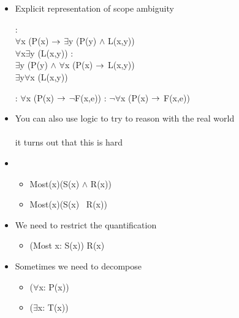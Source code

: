 \documentclass[a4paper,landscape,headrule,footrule,xetex]{foils}
\begin{document}

\begin{itemize}
\item Explicit representation of scope ambiguity
  \begin{exe}
    \ex {}
    \begin{xlist}
          \ex {}:  
          \\ $\forall$x (P(x) $\rightarrow$ $\exists$y (P(y) $\wedge$ L(x,y))
          \\ $\forall$x$\exists$y (L(x,y))
          \ex {}: 
          \\   $\exists$y (P(y) $\wedge$ $\forall$x (P(x) $\rightarrow$ L(x,y))
          \\  $\exists$y$\forall$x (L(x,y))
    \end{xlist}
    \ex {}
    \begin{xlist}
          \ex {}:  
          $\forall$x (P(x)  $\rightarrow$  $\neg$F(x,e))
          \ex {}:  
          $\neg\forall$x (P(x)  $\rightarrow$  F(x,e))
    \end{xlist}
  \end{exe}
\item You can also use logic to try to reason with the real world
   \\ 
   \\ it turns out that this is hard
\end{itemize}



\begin{itemize}
\item {}
  \begin{itemize}
  \item Most(x)(S(x) $\wedge$ R(x))
    \\ 
  \item Most(x)(S(x) \into\  R(x))
    \\ 
  \end{itemize}
\item We need to restrict the quantification
  \begin{itemize}
  \item (Most x: S(x)) R(x)
  \end{itemize}
\item Sometimes we need to decompose
  \begin{itemize}
  \item {} ($\forall$x: P(x))
  \item {} ($\exists$x: T(x))
  \end{itemize}
\end{itemize}
\end{document}
